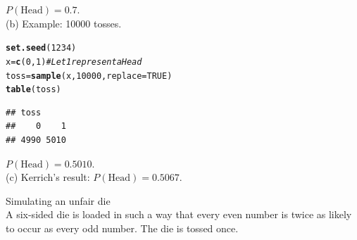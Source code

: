 \documentclass[bigtut]{tutorial}\usepackage[]{graphicx}\usepackage[]{color}
\makeatletter
\newcommand{\hlnum}[1]{\textcolor[rgb]{0.686,0.059,0.569}{#1}}%
\newcommand{\hlcom}[1]{\textcolor[rgb]{0.678,0.584,0.686}{\textit{#1}}}%
\newcommand{\hlstd}[1]{\textcolor[rgb]{0.345,0.345,0.345}{#1}}%
\newcommand{\hlkwb}[1]{\textcolor[rgb]{0.69,0.353,0.396}{#1}}%
\newcommand{\hlkwc}[1]{\textcolor[rgb]{0.333,0.667,0.333}{#1}}%
\newcommand{\hlkwd}[1]{\textcolor[rgb]{0.737,0.353,0.396}{\textbf{#1}}}%
\newenvironment{kframe}{%
 \def\at@end@of@kframe{}%
 \ifinner\ifhmode%
  \def\at@end@of@kframe{\end{minipage}}%
  \begin{minipage}{\columnwidth}%
 \fi\fi%
 \def\FrameCommand##1{\hskip\@totalleftmargin \hskip-\fboxsep
 \colorbox{shadecolor}{##1}\hskip-\fboxsep
     \hskip-\linewidth \hskip-\@totalleftmargin \hskip\columnwidth}%
 \MakeFramed {\advance\hsize-\width
   \@totalleftmargin\z@ \linewidth\hsize
   \@setminipage}}%
 {\par\unskip\endMakeFramed%
 \at@end@of@kframe}
\newenvironment{knitrout}{}{} %
\makeatother
\begin{document}
\begin{tutorial}
\begin{questions}
\begin{solution}
$P(\mbox{Head}) = 0.7$. \\

(b) Example: 10000 tosses. 

\begin{knitrout}
\color{fgcolor}\begin{kframe}
\begin{alltt}
\hlkwd{set.seed}\hlstd{(}\hlnum{1234}\hlstd{)}
\hlstd{x}\hlkwb{=}\hlkwd{c}\hlstd{(}\hlnum{0}\hlstd{,}\hlnum{1}\hlstd{)}    \hlcom{#Let 1 represent a Head}
\hlstd{toss}\hlkwb{=}\hlkwd{sample}\hlstd{(x,}\hlnum{10000}\hlstd{,}\hlkwc{replace}\hlstd{=}\hlnum{TRUE}\hlstd{)}
\hlkwd{table}\hlstd{(toss)}
\end{alltt}
\begin{verbatim}
## toss
##    0    1 
## 4990 5010
\end{verbatim}
\end{kframe}
\end{knitrout}

$P(\mbox{Head}) = 0.5010$. \\

(c) Kerrich's result: $P(\mbox{Head}) = 0.5067$.
\end{solution}


\question Simulating an unfair die  \\

A six-sided die is loaded in such a way that every even number is twice as likely to
occur as every odd number.  The die is tossed once. \\

\end{questions}
\end{tutorial}
\end{document}
